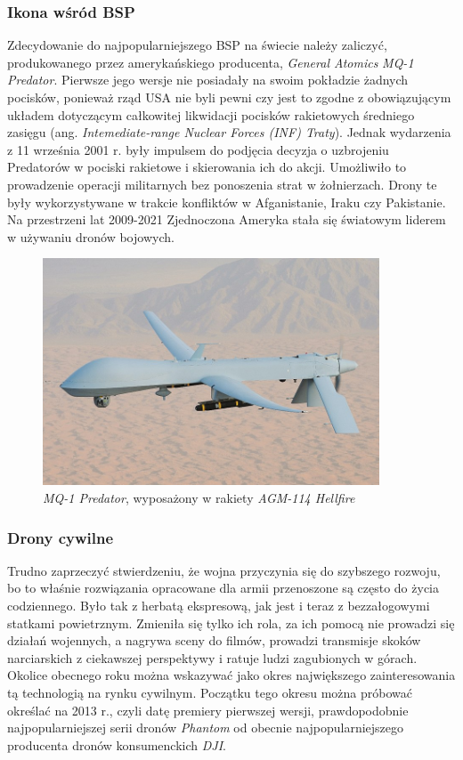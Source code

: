 \subsubsection{Ikona wśród BSP}
Zdecydowanie do najpopularniejszego BSP na świecie należy zaliczyć, produkowanego przez amerykańskiego producenta, \textit{General Atomics} \textit{MQ-1 Predator}. Pierwsze jego wersje nie posiadały na swoim pokładzie żadnych pocisków, ponieważ rząd USA nie byli pewni czy jest to zgodne z obowiązującym układem dotyczącym całkowitej likwidacji pocisków rakietowych średniego zasięgu (ang. \textit{Intemediate-range Nuclear Forces (INF) Traty}). Jednak wydarzenia z 11 września 2001 r. były impulsem do podjęcia decyzja o uzbrojeniu Predatorów w pociski rakietowe i skierowania ich do akcji. Umożliwiło to prowadzenie operacji militarnych bez ponoszenia strat w żołnierzach. Drony te były wykorzystywane w trakcie konfliktów w Afganistanie, Iraku czy Pakistanie. Na przestrzeni lat 2009-2021 Zjednoczona Ameryka stała się światowym liderem w używaniu dronów bojowych.\cite{dron-ibuk}\cite{predator-wiki} 


\begin{figure}[!ht]
  \centering
  \includegraphics[width=10cm]{./Obrazy/predator.jpg}
  \caption{\textit{MQ-1 Predator}, wyposażony w rakiety \textit{AGM-114 Hellfire}}
  \end{figure}

\subsubsection{Drony cywilne}
Trudno zaprzeczyć stwierdzeniu, że wojna przyczynia się do szybszego rozwoju, bo to właśnie rozwiązania opracowane dla armii przenoszone są często do życia codziennego. Było tak z herbatą ekspresową, jak jest i teraz z bezzałogowymi statkami powietrznym. Zmieniła się tylko ich rola, za ich pomocą nie prowadzi się działań wojennych, a nagrywa sceny do filmów, prowadzi transmisje skoków narciarskich z ciekawszej perspektywy i ratuje ludzi zagubionych w górach. Okolice obecnego roku można wskazywać jako okres największego zainteresowania tą technologią na rynku cywilnym. Początku tego okresu można próbować określać na 2013 r., czyli datę premiery pierwszej wersji, prawdopodobnie najpopularniejszej serii dronów \textit{Phantom} od obecnie najpopularniejszego producenta dronów konsumenckich \textit{DJI}.

